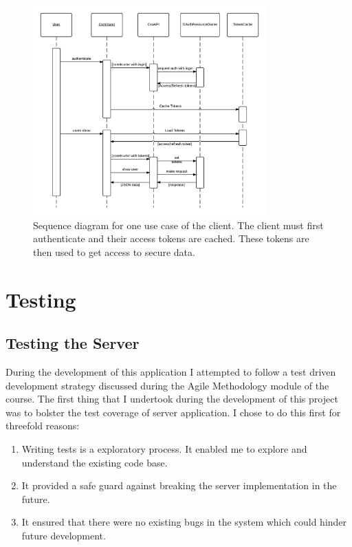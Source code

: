 \documentclass[paper=a4, fontsize=11pt]{scrartcl}	%
\numberwithin{equation}{section}															%
\numberwithin{figure}{section}																%
\numberwithin{table}{section}
\begin{document}
\begin{figure}[H]
\centering
\includegraphics[width=0.8\textwidth]{img/client_sequence.png}
\caption{Sequence diagram for one use case of the client. The client must first authenticate and their access tokens are cached. These tokens are then used to get access to secure data.}
\label{fig:client-sequence}
\end{figure}

\section{Testing}
\label{sec:testing}

\subsection{Testing the Server}
\label{subsec:server-testing}
During the development of this application I attempted to follow a test driven development strategy discussed during the Agile Methodology module of the course. The first thing that I undertook during the development of this project was to bolster the test coverage of server application. I chose to do this first for threefold reasons:

\begin{enumerate}
\item Writing tests is a exploratory process. It enabled me to explore and understand the existing code base.
\item It provided a safe guard against breaking the server implementation in the future.
\item It ensured that there were no existing bugs in the system which could hinder future development.
\end{enumerate}
\end{document}
